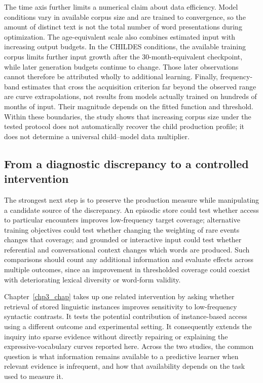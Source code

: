 The time axis further limits a numerical claim about data efficiency. Model conditions vary in available corpus size and are trained to convergence, so the amount of distinct text is not the total number of word presentations during optimization. The age-equivalent scale also combines estimated input with increasing output budgets. In the CHILDES conditions, the available training corpus limits further input growth after the 30-month-equivalent checkpoint, while later generation budgets continue to change. Those later observations cannot therefore be attributed wholly to additional learning. Finally, frequency-band estimates that cross the acquisition criterion far beyond the observed range are curve extrapolations, not results from models actually trained on hundreds of months of input. Their magnitude depends on the fitted function and threshold. Within these boundaries, the study shows that increasing corpus size under the tested protocol does not automatically recover the child production profile; it does not determine a universal child--model data multiplier.

\subsection{From a diagnostic discrepancy to a controlled intervention}

The strongest next step is to preserve the production measure while manipulating a candidate source of the discrepancy. An episodic store could test whether access to particular encounters improves low-frequency target coverage; alternative training objectives could test whether changing the weighting of rare events changes that coverage; and grounded or interactive input could test whether referential and conversational context changes which words are produced. Such comparisons should count any additional information and evaluate effects across multiple outcomes, since an improvement in thresholded coverage could coexist with deteriorating lexical diversity or word-form validity.

Chapter~\ref{chp3_chap} takes up one related intervention by asking whether retrieval of stored linguistic instances improves sensitivity to low-frequency syntactic contrasts. It tests the potential contribution of instance-based access using a different outcome and experimental setting. It consequently extends the inquiry into sparse evidence without directly repairing or explaining the expressive-vocabulary curves reported here. Across the two studies, the common question is what information remains available to a predictive learner when relevant evidence is infrequent, and how that availability depends on the task used to measure it.

